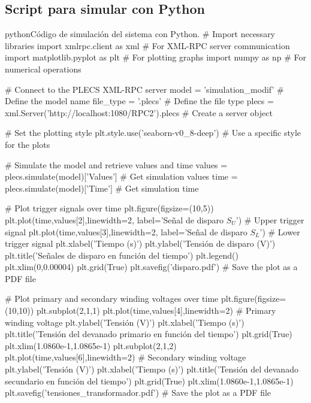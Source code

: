 \begin{appendixd}
	
	
	\section{Script para simular con Python}
	
	\begin{sourcecode}{python}{Código de simulación del sistema con Python.}
	# Import necessary libraries
	import xmlrpc.client as xml  # For XML-RPC server communication
	import matplotlib.pyplot as plt  # For plotting graphs
	import numpy as np  # For numerical operations
	
	# Connect to the PLECS XML-RPC server
	model = 'simulation_modif'  # Define the model name
	file_type = '.plecs'  # Define the file type
	plecs = xml.Server('http://localhost:1080/RPC2').plecs  # Create a server object
	
	# Set the plotting style
	plt.style.use('seaborn-v0_8-deep')  # Use a specific style for the plots
	
	# Simulate the model and retrieve values and time
	values = plecs.simulate(model)['Values']  # Get simulation values
	time = plecs.simulate(model)['Time']  # Get simulation time
	
	# Plot trigger signals over time
	plt.figure(figsize=(10,5))
	plt.plot(time,values[2],linewidth=2, label='Señal de disparo $S_U$')  # Upper trigger signal
	plt.plot(time,values[3],linewidth=2, label='Señal de disparo $S_L$')  # Lower trigger signal
	plt.xlabel('Tiempo (s)')
	plt.ylabel('Tensión de disparo (V)')
	plt.title('Señales de disparo en función del tiempo')
	plt.legend()
	plt.xlim(0,0.00004)
	plt.grid(True)
	plt.savefig('disparo.pdf')  # Save the plot as a PDF file
	
	# Plot primary and secondary winding voltages over time
	plt.figure(figsize=(10,10))
	plt.subplot(2,1,1)
	plt.plot(time,values[4],linewidth=2)  # Primary winding voltage
	plt.ylabel('Tensión (V)')
	plt.xlabel('Tiempo (s)')
	plt.title('Tensión del devanado primario en función del tiempo')
	plt.grid(True)
	plt.xlim(1.0860e-1,1.0865e-1)
	plt.subplot(2,1,2)
	plt.plot(time,values[6],linewidth=2)  # Secondary winding voltage
	plt.ylabel('Tensión (V)')
	plt.xlabel('Tiempo (s)')
	plt.title('Tensión del devanado secundario en función del tiempo')
	plt.grid(True)
	plt.xlim(1.0860e-1,1.0865e-1)
	plt.savefig('tensiones_transformador.pdf')  # Save the plot as a PDF file
	

\end{sourcecode}
\end{appendixd}
